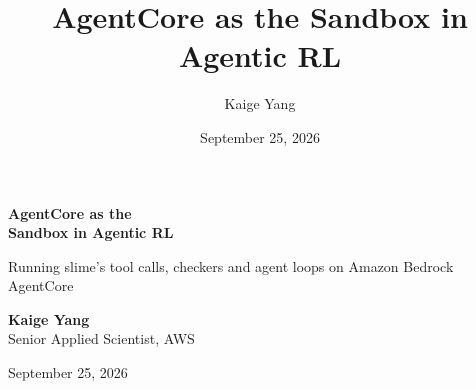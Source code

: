 
\usepackage{amssymb}

\newcommand{\tc}[1]{\texttt{#1}}
\newcommand{\ptitle}[1]{{\footnotesize\bfseries\color{awsteal}#1}\par\vspace{0.5mm}}

\title{AgentCore as the Sandbox in Agentic RL}
\author{Kaige Yang}
\date{September 25, 2026}



{
\begin{frame}[plain]
\vspace*{6mm}
\begin{minipage}{0.56\textwidth}
{\fontsize{23}{28}\selectfont\bfseries\color{white}AgentCore as the\\Sandbox in Agentic RL\par}
\vspace{4mm}
{\raggedright\large\color{white}Running slime's tool calls, checkers and agent loops on Amazon Bedrock AgentCore\par}
\vspace{12mm}
{\small\color{white}\textbf{Kaige Yang}\\Senior Applied Scientist, AWS\par}
\vspace{3mm}
{\scriptsize\color{inkmuted}September 25, 2026}
\end{minipage}
\end{frame}}

